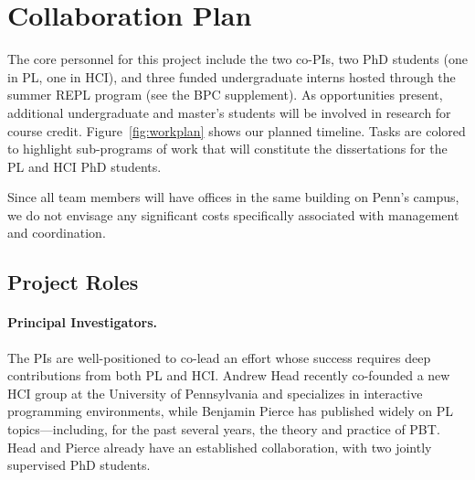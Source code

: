 \section*{Collaboration Plan }\label{appendix:coord}


The core personnel for this project include the two co-PIs, two PhD
students (one in PL, one in HCI),
and three funded undergraduate interns hosted through the summer REPL
program (see the BPC supplement). As opportunities present, additional
undergraduate and master's students will be involved in research for
course credit.
Figure~\ref{fig:workplan} shows our planned timeline. Tasks are colored
to highlight sub-programs of work that will constitute the
dissertations for the PL and HCI PhD students.

Since all team members will have offices in the same building on
Penn's campus, we do not envisage any significant costs specifically
associated with management and coordination.

\subsection*{Project Roles}

\paragraph*{Principal Investigators.}
%
The PIs are well-positioned to co-lead an effort whose success
requires deep contributions from both PL and HCI.  Andrew Head
recently co-founded a new HCI group at the University of Pennsylvania
and specializes in interactive programming environments, while
Benjamin Pierce has published widely on PL topics---including, for the
past several years, the theory and practice of PBT.  Head and Pierce
already have an established collaboration, with two jointly supervised
PhD students.

